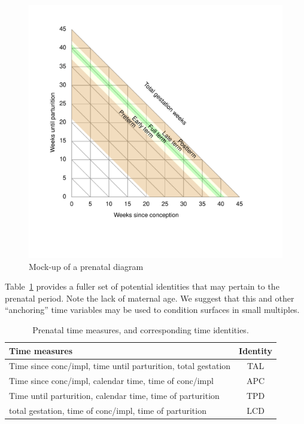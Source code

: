 \documentclass[11pt,oneside]{article} %
\begin{document}
		\begin{figure}
		\caption{Mock-up of a prenatal diagram}
		\label{fig:prenat}
		\includegraphics[scale=.8]{Figures/PrenatalDiagram.pdf}
		\end{figure}
		
		Table~\ref{tab:prenat} provides a fuller set of potential identities that may
		pertain to the prenatal period. Note the lack of maternal age.
		We suggest that this and other ``anchoring'' time variables may be used to
		condition surfaces in small multiples.
		
		\begin{table}[h!]
		\caption{Prenatal time measures, and corresponding time identities.}
	    \label{tab:prenat}
		\begin{tabular}{lc}
		Time measures & Identity \\ \hline
		Time since conc/impl, time until parturition, total gestation & TAL\\
		Time since conc/impl, calendar time, time of conc/impl & APC\\
		Time until parturition, calendar time, time of parturition & TPD\\
		total gestation, time of conc/impl, time of parturition & LCD
		\end{tabular}
		\end{table}
		
\end{document}
